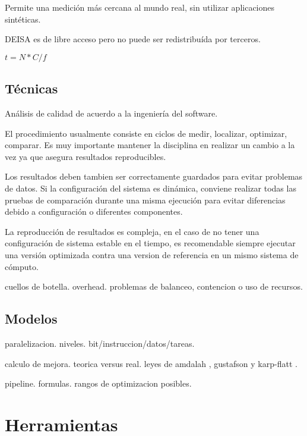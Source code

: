 \documentclass[a4paper]{report}
\begin{document}
Permite una medici\'on m\'as cercana al mundo real, sin utilizar aplicaciones sint\'eticas.

DEISA es de libre acceso pero no puede ser redistribu\'ida por terceros.

\bigskip

$ t = N * C / f $

\section{T\'ecnicas}

An\'alisis de calidad de acuerdo a la ingenier\'ia del software.

\bigskip

El procedimiento usualmente consiste en ciclos de medir, localizar, optimizar, comparar.
Es muy importante mantener la disciplina en realizar un cambio a la vez ya que asegura resultados reproducibles.

Los resultados deben tambien ser correctamente guardados para evitar problemas de datos.
Si la configuraci\'on del sistema es din\'amica, conviene realizar todas las pruebas de comparaci\'on durante una
misma ejecuci\'on para evitar diferencias debido a configuraci\'on o diferentes componentes.

\bigskip

La reproducci\'on de resultados es compleja, en el caso de no tener una configuraci\'on de sistema estable en el
tiempo, es recomendable siempre ejecutar una versi\'on optimizada contra una version de referencia en un mismo
sistema de c\'omputo.

\bigskip

cuellos de botella. overhead. problemas de balanceo, contencion o uso de recursos.

\section{Modelos}

paralelizacion. niveles. bit/instruccion/datos/tareas.

calculo de mejora. teorica versus real. leyes de amdalah \cite{amdahl}, gustafson
\cite{gustafson} y karp-flatt \cite{karp-flatt}.

pipeline. formulas. rangos de optimizacion posibles.

\chapter{Herramientas}
\end{document}
